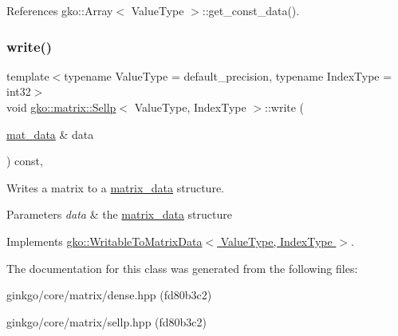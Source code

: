 References gko\+::\+Array$<$ Value\+Type $>$\+::get\+\_\+const\+\_\+data().

\mbox{\label{classgko_1_1matrix_1_1Sellp_aae2355a2866318b154d017b1c51f30a5}} 
\subsubsection{\texorpdfstring{write()}{write()}}
{\footnotesize\ttfamily template$<$typename Value\+Type = default\+\_\+precision, typename Index\+Type = int32$>$ \\
void \hyperlink{classgko_1_1matrix_1_1Sellp}{gko\+::matrix\+::\+Sellp}$<$ Value\+Type, Index\+Type $>$\+::write (\begin{DoxyParamCaption}\item[{\hyperlink{structgko_1_1matrix__data}{mat\+\_\+data} \&}]{data }\end{DoxyParamCaption}) const\hspace{0.3cm}{\ttfamily [override]}, {\ttfamily [virtual]}}



Writes a matrix to a \hyperlink{structgko_1_1matrix__data}{matrix\+\_\+data} structure. 


\begin{DoxyParams}{Parameters}
{\em data} & the \hyperlink{structgko_1_1matrix__data}{matrix\+\_\+data} structure \\
\hline
\end{DoxyParams}


Implements \hyperlink{classgko_1_1WritableToMatrixData_a96036c3a4bf4c67fa93002808b8b14e2}{gko\+::\+Writable\+To\+Matrix\+Data$<$ Value\+Type, Index\+Type $>$}.



The documentation for this class was generated from the following files\+:\begin{DoxyCompactItemize}
\item 
ginkgo/core/matrix/dense.\+hpp (fd80b3c2)\item 
ginkgo/core/matrix/sellp.\+hpp (fd80b3c2)\end{DoxyCompactItemize}
